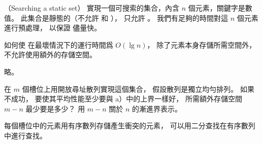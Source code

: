 \startPROBLEM
（Searching a static set）
實現一個可搜索的集合，內含 $n$ 個元素，關鍵字是數值。
此集合是靜態的（不允許  和 ），
只允許 。
我們有足夠的時間對這 $n$ 個元素進行預處理，
以保證  儘量快。

\startigBase[a]\startitem
如何使  在最壞情況下的運行時間爲 $O(\lg n)$，
除了元素本身存儲所需空間外，不允許使用額外的存儲空間。
\stopitem\stopigBase

\startANSWER
略。
\stopANSWER

\startigBase[continue]\startitem
在 $m$ 個槽位上用開放尋址散列實現這個集合，
假設散列是獨立均勻排列。
如果  不成功，
要使其平均性能至少要與 a）中的上界一樣好，
所需額外存儲空間 $m-n$ 最少要是多少？
用 $m-n$ 關於 $n$ 的漸進界表示。
\stopitem\stopigBase

\startANSWER
每個槽位中的元素用有序數列存儲產生衝突的元素，
可以用二分查找在有序數列中進行查找。
\stopANSWER

\stopPROBLEM